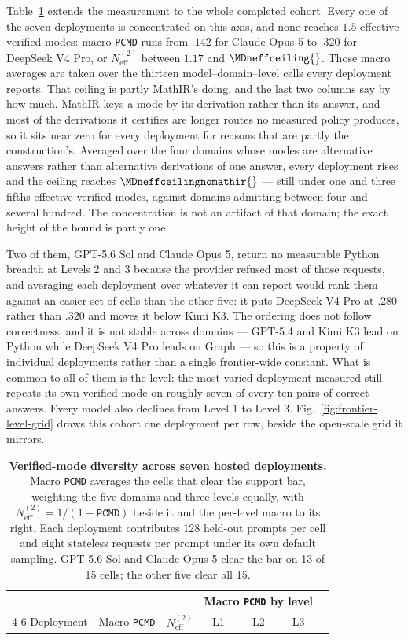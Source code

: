 \documentclass{article}
\newcommand{\1}{\mathbf 1}
\newcommand{\pmd}{\texttt{PCMD}}
\newcommand{\neff}{\ensuremath{N^{(2)}_{\mathrm{eff}}}}
\theoremstyle{remark}
\theoremstyle{definition}
\theoremstyle{plain}
\begin{document}
Table~\ref{tab:hosted-cohort-mode-diversity} extends the measurement to the
whole completed cohort. Every one of the seven deployments is concentrated on
this axis, and none reaches $1.5$ effective verified modes: macro \pmd{} runs
from $.142$ for Claude Opus 5 to $.320$ for DeepSeek V4 Pro, or $\neff$ between
$1.17$ and $\MDneffceiling{}$. Those macro averages are taken over the thirteen
model--domain--level cells every deployment reports. That ceiling is partly
MathIR's doing, and the last two columns say by how much. MathIR keys a mode by
its derivation rather than its answer, and most of the derivations it certifies
are longer routes no measured policy produces, so it sits near zero for every
deployment for reasons that are partly the construction's. Averaged over the four domains whose modes are alternative answers rather than
alternative derivations of one answer, every deployment rises and the ceiling
reaches $\MDneffceilingnomathir{}$ --- still under one and three fifths
effective verified modes, against domains admitting between four and several
hundred.
The concentration is not an artifact of that domain; the exact height of the
bound is partly one.

 Two of them, GPT-5.6 Sol
and Claude Opus 5, return no measurable Python breadth at Levels 2 and 3
because the provider refused most of those requests, and averaging each
deployment over whatever it can report would rank them against an easier set of
cells than the other five: it puts DeepSeek V4 Pro at $.280$ rather than $.320$
and moves it below Kimi K3. The ordering does not follow correctness, and it is not stable
across domains --- GPT-5.4 and Kimi K3 lead on Python while DeepSeek V4 Pro
leads on Graph --- so this is a property of individual deployments rather than
a single frontier-wide constant. What is common to all of them is the level:
the most varied deployment measured still repeats its own verified mode on
roughly seven of every ten pairs of correct answers. Every model also declines
from Level 1 to Level 3. Fig.~\ref{fig:frontier-level-grid} draws this
cohort one deployment per row, beside the open-scale grid it mirrors.

\begin{table}[!htbp]
  \centering
  \caption{\textbf{Verified-mode diversity across seven hosted deployments.}
  Macro \pmd{} averages the cells that clear the support bar, weighting the
  five domains and three levels equally, with $\neff=1/(1-\pmd{})$ beside it
  and the per-level macro to its right. Each deployment contributes 128
  held-out prompts per cell and eight stateless requests per prompt under its
  own default sampling. GPT-5.6 Sol and Claude Opus 5 clear the bar on 13 of
  15 cells; the other five clear all 15.}
  \label{tab:hosted-cohort-mode-diversity}
  \small
  \begin{tabular}{lcccccc}
    \toprule
    & & & \multicolumn{3}{c}{Macro \pmd{} by level} \\
    \cmidrule(lr){4-6}
    Deployment & Macro \pmd{} & $\neff$ & L1 & L2 & L3 \\
    \midrule
    
  \end{tabular}
\end{table}
\end{document}
